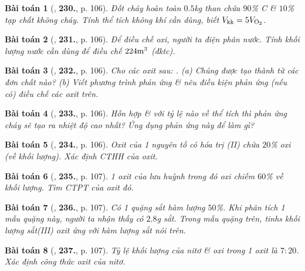 \documentclass{article}
\numberwithin{equation}{section}
\newtheorem{baitoan}{Bài toán}
\begin{document}
\begin{baitoan}[\cite{An_400_BT_Hoa_Hoc_8_2020}, \textbf{230.}, p. 106]
	Đốt cháy hoàn toàn $0.5$\emph{kg} than chứa $90$\% \emph{C} \& $10$\% tạp chất không cháy. Tính thể tích không khí cần dùng, biết $V_{\rm kk} = 5V_{\rm O_2}$.
\end{baitoan}

\begin{baitoan}[\cite{An_400_BT_Hoa_Hoc_8_2020}, \textbf{231.}, p. 106]
	Để điều chế oxi, người ta điện phân nước. Tính khối lượng nước cần dùng để điều chế $224{\rm m}^3$ \emph{} (đktc).
\end{baitoan}

\begin{baitoan}[\cite{An_400_BT_Hoa_Hoc_8_2020}, \textbf{232.}, p. 106]
	Cho các oxit sau: \emph{}. (a) Chúng được tạo thành từ các đơn chất nào? (b) Viết phương trình phản ứng \& nêu điều kiện phản ứng (nếu có) điều chế các oxit trên.
\end{baitoan}

\begin{baitoan}[\cite{An_400_BT_Hoa_Hoc_8_2020}, \textbf{233.}, p. 106]
	Hỗn hợp \emph{} \& \emph{} với tỷ lệ nào về thể tích thì phản ứng cháy sẽ tạo ra nhiệt độ cao nhất? Ứng dụng phản ứng này để làm gì?
\end{baitoan}

\begin{baitoan}[\cite{An_400_BT_Hoa_Hoc_8_2020}, \textbf{234.}, p. 106]
	Oxit của 1 nguyên tố có hóa trị (II) chứa $20$\% oxi (về khối lượng). Xác định CTHH của oxit.
\end{baitoan}

\begin{baitoan}[\cite{An_400_BT_Hoa_Hoc_8_2020}, \textbf{235.}, p. 107]
	1 oxit của lưu huỳnh trong đó oxi chiếm $60$\% về khối lượng. Tìm CTPT của oxit đó.
\end{baitoan}

\begin{baitoan}[\cite{An_400_BT_Hoa_Hoc_8_2020}, \textbf{236.}, p. 107]
	Có 1 quặng sắt hàm lượng $50$\%. Khi phân tích 1 mẫu quặng này, người ta nhận thấy có $2.8$\emph{g} sắt. Trong mẫu quặng trên, tinhs khối lượng sắt(III) oxit \emph{} ứng với hàm lượng sắt nói trên.
\end{baitoan}

\begin{baitoan}[\cite{An_400_BT_Hoa_Hoc_8_2020}, \textbf{237.}, p. 107]
	Tỷ lệ khối lượng của nitơ \& oxi trong 1 oxit là $7:20$. Xác định công thức oxit của nitơ.
\end{baitoan}
\end{document}
